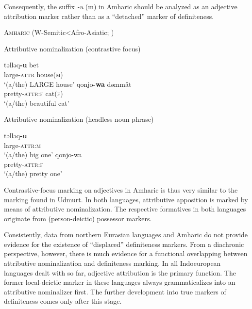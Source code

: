 {Consequently, the suffix \textit{-u} ({\sc m}) in Amharic should be analyzed as an adjective attribution marker rather than as a “detached” marker of definiteness. 
\begin{exe}
\ex	\textsc{Amharic} (W-Semitic<Afro-Asiatic; \citealt{hudson1997})
\begin{xlist}
\ex	Attributive nominalization (contrastive focus)
\begin{xlist}
\ex
\gll	təlləq\textbf{-u} bet\\
	large-\textsc{attr} house(\textsc{m})\\
\glt	‘(a/the) LARGE house’
\ex	
\gll	qonjo\textbf{-wa} dəmmät\\
	pretty-\textsc{attr:f} cat(\textsc{f})\\
\glt	‘(a/the) beautiful cat’
\end{xlist}
\ex	Attributive nominalization (headless noun phrase)
\begin{xlist}
\ex
\gll	təlləq\textbf{-u}\\
	large-\textsc{attr:m}\\
\glt	‘(a/the) big one’
\ex	
\gll	qonjo-wa\\
	pretty-\textsc{attr:f}\\
\glt	‘(a/the) pretty one’
\end{xlist}
\end{xlist}
\end{exe}
Contrastive-focus marking on adjectives in Amharic is thus very similar to the marking found in Udmurt. In both languages, attributive apposition is marked by means of attributive nominalization. The respective formatives in both languages originate from (person-deictic) possessor markers.

Consistently, data from northern Eurasian languages and Amharic do not provide evidence for the existence of “displaced” definiteness markers. From a diachronic perspective, however, there is much evidence for a functional overlapping between attributive nominalization and definiteness marking. In all Indoeuropean languages dealt with so far, adjective attribution is the primary function. The former local-deictic marker in these languages always grammaticalizes into an attributive nominalizer first. The further development into true markers of definiteness comes only after this stage.

}

